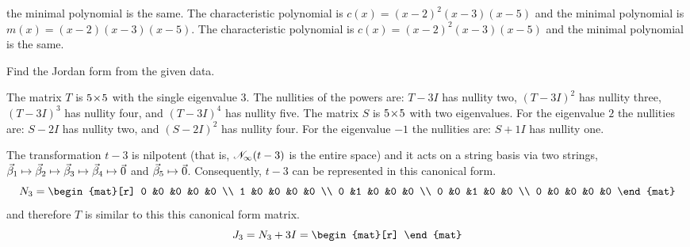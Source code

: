 \begin{exercises}
\begin{answer}
\begin{exparts}
          the minimal polynomial is the same.
        \partsitem The characteristic polynomial is 
          $c(x)=(x-2)^2(x-3)(x-5)$ and
          the minimal polynomial is $m(x)=(x-2)(x-3)(x-5)$.
        \partsitem The characteristic polynomial is 
          $c(x)=(x-2)^2(x-3)(x-5)$ and
          the minimal polynomial is the same.
      \end{exparts}
    \end{answer}
  \recommended \item
    Find the Jordan form from the given data.
    \begin{exparts}
       \partsitem The matrix 
         \( T \) is \( 5 \! \times \! 5 \) with the single eigenvalue $3$.
         The nullities of the powers are:
         \( T-3I \) has nullity two, \( (T-3I)^2 \) has nullity three,
         \( (T-3I)^3 \) has nullity four, and \( (T-3I)^4 \) has nullity
         five.
       \partsitem The matrix \( S \) is \( 5 \! \times \! 5 \) with two eigenvalues.
         For the eigenvalue $2$ the nullities are:
         \( S-2I \) has nullity two, and \( (S-2I)^2 \) has nullity four.
         For the eigenvalue $-1$ the nullities are:
         \( S+1I \) has nullity one.
    \end{exparts}
    \begin{answer}
      \begin{exparts}
         \partsitem The transformation $t-3$ is nilpotent 
          (that is, $\mathscr{N}_\infty(t-3)$ is the entire space)
          and it acts on a string basis via two strings, 
          $\vec{\beta}_1\mapsto\vec{\beta}_2\mapsto\vec{\beta}_3
            \mapsto\vec{\beta}_4\mapsto\vec{0}$
          and $\vec{\beta}_5\mapsto\vec{0}$.
          Consequently, $t-3$ can be represented in this canonical form.
          \begin{equation*}
            N_3=
            \begin{mat}[r]
               0  &0  &0  &0  &0  \\
               1  &0  &0  &0  &0  \\
               0  &1  &0  &0  &0  \\
               0  &0  &1  &0  &0  \\
               0  &0  &0  &0  &0
             \end{mat}
          \end{equation*}
          and therefore $T$ is similar to this this canonical form matrix.
          \begin{equation*}
           J_3=N_3+3I=
           \begin{mat}[r]

\end{mat}
\end{equation*}
\end{exparts}
\end{answer}
\end{exercises}
